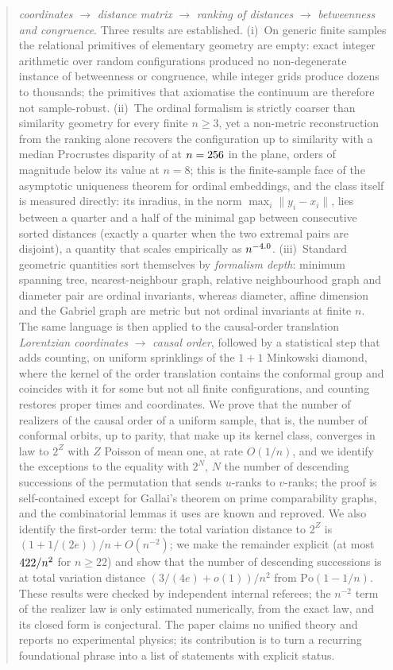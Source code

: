 \documentclass[11pt,a4paper]{article}
\theoremstyle{plain}
\theoremstyle{definition}
\theoremstyle{remark}
\begin{document}
\begin{abstract}
\emph{coordinates} $\to$ \emph{distance matrix} $\to$ \emph{ranking of distances} $\to$ \emph{betweenness and congruence}. Three results are established. (i)~On generic finite samples the relational primitives of elementary geometry are empty: exact integer arithmetic over \EoneTotalConfigs{} random configurations produced no non-degenerate instance of betweenness or congruence, while integer grids produce dozens to thousands; the primitives that axiomatise the continuum are therefore not sample-robust. (ii)~The ordinal formalism is strictly coarser than similarity geometry for every finite $n\ge 3$, yet a non-metric reconstruction from the ranking alone recovers the configuration up to similarity with a median Procrustes disparity of \EtwoMedDtwoLast{} at $n=\EtwoNmaxDtwo$ in the plane, \EtwoDropDtwo{} orders of magnitude below its value at $n=8$; this is the finite-sample face of the asymptotic uniqueness theorem for ordinal embeddings, and the class itself is measured directly: its inradius, in the norm $\max_i\lVert y_i-x_i\rVert$, lies between a quarter and a half of the minimal gap between consecutive sorted distances (exactly a quarter when the two extremal pairs are disjoint), a quantity that scales empirically as $n^{-\EtwocSlopeGap}$. (iii)~Standard geometric quantities sort themselves by \emph{formalism depth}: minimum spanning tree, nearest-neighbour graph, relative neighbourhood graph and diameter pair are ordinal invariants, whereas diameter, affine dimension and the Gabriel graph are metric but not ordinal invariants at finite $n$. The same language is then applied to the causal-order translation \emph{Lorentzian coordinates} $\to$ \emph{causal order}, followed by a statistical step that adds counting, on uniform sprinklings of the $1{+}1$ Minkowski diamond, where the kernel of the order translation contains the conformal group and coincides with it for some but not all finite configurations, and counting restores proper times and coordinates. We prove that the number of realizers of the causal order of a uniform sample, that is, the number of conformal orbits, up to parity, that make up its kernel class, converges in law to $2^{Z}$ with $Z$ Poisson of mean one, at rate $O(1/n)$, and we identify the exceptions to the equality with $2^{N}$, $N$ the number of descending successions of the permutation that sends $u$-ranks to $v$-ranks; the proof is self-contained except for Gallai's theorem on prime comparability graphs, and the combinatorial lemmas it uses are known and reproved. We also identify the first-order term: the total variation distance to $2^Z$ is $(1+1/(2e))/n+O(n^{-2})$; we make the remainder explicit (at most $\SecCtwentytwo/n^2$ for $n\ge22$) and show that the number of descending successions is at total variation distance $(3/(4e)+o(1))/n^2$ from $\mathrm{Po}(1-1/n)$. These results were checked by independent internal referees; the $n^{-2}$ term of the realizer law is only estimated numerically, from the exact law, and its closed form is conjectural. The paper claims no unified theory and reports no experimental physics; its contribution is to turn a recurring foundational phrase into a list of statements with explicit status.
\end{abstract}
\end{document}
